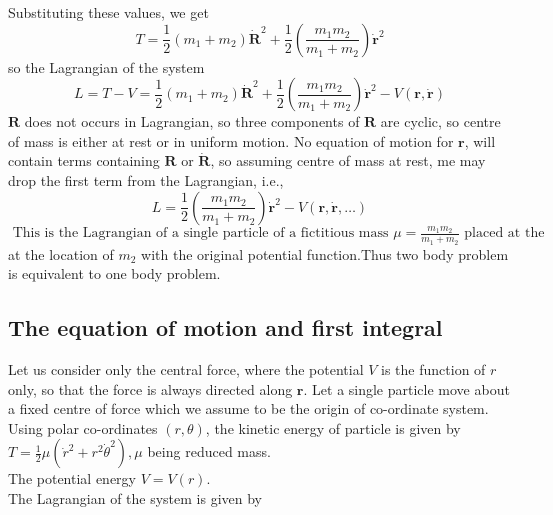 Substituting these values, we get
$$
T=\frac{1}{2}\left(m_{1}+m_{2}\right) \dot{\mathbf{R}}^{2}+\frac{1}{2}\left(\frac{m_{1} m_{2}}{m_{1}+m_{2}}\right) \dot{\mathbf{r}}^{2}
$$
so the Lagrangian of the system
$$
L=T-V=\frac{1}{2}\left(m_{1}+m_{2}\right) \dot{\mathbf{R}}^{2}+\frac{1}{2}\left(\frac{m_{1} m_{2}}{m_{1}+m_{2}}\right) \dot{\mathbf{r}}^{2}-V(\mathbf{r}, \dot{\mathbf{r}})
$$
$\mathbf{R}$ does not occurs in Lagrangian, so three components of $\mathbf{R}$ are cyclic, so centre of mass is either at rest or in uniform motion. No equation of motion for $\mathbf{r}$, will contain terms containing $\mathbf{R}$ or $\dot{\mathbf{R}}$, so assuming centre of mass at rest, me may drop the first term from the Lagrangian, i.e.,
$$
L=\frac{1}{2}\left(\frac{m_{1} m_{2}}{m_{1}+m_{2}}\right) \dot{\mathbf{r}}^{2}-V(\mathbf{r}, \dot{\mathbf{r}}, \ldots)
$$
$\text { This is the Lagrangian of a single particle of a fictitious mass } \mu=\frac{m_{1} m_{2}}{m_{1}+m_{2}} \text { placed at the }$ at the location of $m_2$ with the original potential function.Thus two body problem is equivalent to one body problem.
\subsection{The equation of motion and first integral}
Let us consider only the central force, where the potential $V$ is the function of $r$ only, so that the force is always directed along $\mathbf{r}$. Let a single particle move about a fixed centre of force which we assume to be the origin of co-ordinate system. Using polar co-ordinates $(r, \theta)$, the kinetic energy of particle is given by\\
$T=\frac{1}{2} \mu\left(\dot{r}^{2}+r^{2} \dot{\theta}^{2}\right), \mu$ being reduced mass.\\
The potential energy $V=V(r)$.\\
The Lagrangian of the system is given by

